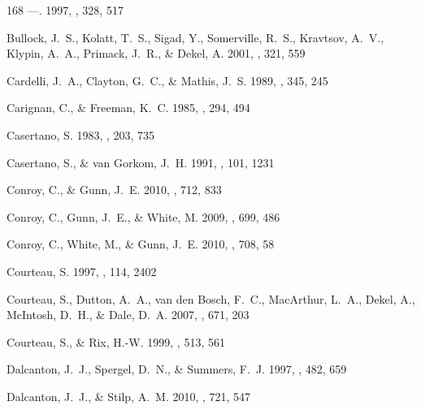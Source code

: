 \documentclass[apj,iop,numberedappendix]{emulateapj}
\begin{document}
\begin{thebibliography}{168}
---. 1997, \aap, 328, 517

{Bullock}, J.~S., {Kolatt}, T.~S., {Sigad}, Y., {Somerville}, R.~S.,
  {Kravtsov}, A.~V., {Klypin}, A.~A., {Primack}, J.~R., \& {Dekel}, A. 2001,
  \mnras, 321, 559

{Cardelli}, J.~A., {Clayton}, G.~C., \& {Mathis}, J.~S. 1989, \apj, 345, 245

{Carignan}, C., \& {Freeman}, K.~C. 1985, \apj, 294, 494

{Casertano}, S. 1983, \mnras, 203, 735

{Casertano}, S., \& {van Gorkom}, J.~H. 1991, \aj, 101, 1231

{Conroy}, C., \& {Gunn}, J.~E. 2010, \apj, 712, 833

{Conroy}, C., {Gunn}, J.~E., \& {White}, M. 2009, \apj, 699, 486

{Conroy}, C., {White}, M., \& {Gunn}, J.~E. 2010, \apj, 708, 58

{Courteau}, S. 1997, \aj, 114, 2402

{Courteau}, S., {Dutton}, A.~A., {van den Bosch}, F.~C., {MacArthur}, L.~A.,
  {Dekel}, A., {McIntosh}, D.~H., \& {Dale}, D.~A. 2007, \apj, 671, 203

{Courteau}, S., \& {Rix}, H.-W. 1999, \apj, 513, 561

{Dalcanton}, J.~J., {Spergel}, D.~N., \& {Summers}, F.~J. 1997, \apj, 482, 659

{Dalcanton}, J.~J., \& {Stilp}, A.~M. 2010, \apj, 721, 547


\end{thebibliography}
\end{document}
